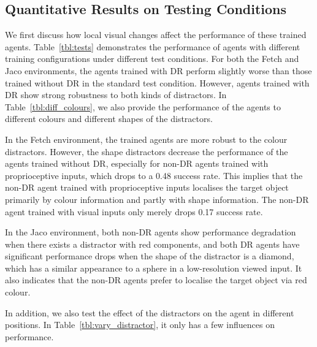 \subsection{Quantitative Results on Testing Conditions}
We first discuss how local visual changes affect the performance of these trained agents. Table~\ref{tbl:tests} demonstrates the performance of agents with different training configurations under different test conditions. For both the Fetch and Jaco environments, the agents trained with DR perform slightly worse than those trained without DR in the standard test condition. However, agents trained with DR show strong robustness to both kinds of distractors. In Table~\ref{tbl:diff_colours}, we also provide the performance of the agents to different colours and different shapes of the distractors.

In the Fetch environment, the trained agents are more robust to the colour distractors. However, the shape distractors decrease the performance of the agents trained without DR, especially for non-DR agents trained with proprioceptive inputs, which drops to a 0.48 success rate. This implies that the non-DR agent trained with proprioceptive inputs localises the target object primarily by colour information and partly with shape information. The non-DR agent trained with visual inputs only merely drops 0.17 success rate. 

In the Jaco environment, both non-DR agents show performance degradation when there exists a distractor with red components, and both DR agents have significant performance drops when the shape of the distractor is a diamond, which has a similar appearance to a sphere in a low-resolution viewed input. It also indicates that the non-DR agents prefer to localise the target object via red colour.

In addition, we also test the effect of the distractors on the agent in different positions. In Table~\ref{tbl:vary_distractor}, it only has a few influences on performance.

